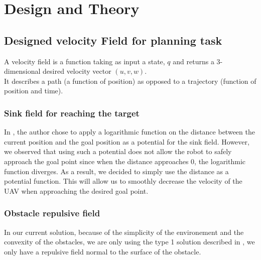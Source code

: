 \section{Design and Theory}
\subsection{Designed velocity Field for planning task}
A velocity field is a function taking as input a state, $q$ and returns a 3-dimensional desired velocity vector $(u,v,w)$.\\ It describes a path (a function of position) as opposed to a trajectory (function of position and time).
\subsubsection{Sink field for reaching the target}
In \cite{mcinnes2003velocity}, the author chose to apply a logarithmic function on the distance between the current position and the goal position as a potential for the sink field. 
However, we observed that using such a potential does not allow the robot to safely approach the goal point since when the distance approaches 0, the logarithmic function diverges.
As a result, we decided to simply use the distance as a potential function. This will allow us to smoothly decrease the velocity of the UAV when approaching the desired goal point.
\subsubsection{Obstacle repulsive field}
In our current solution, because of the simplicity of the environement and the convexity of the obstacles, we are only using the type 1 solution described in \cite{mcinnes2003velocity}, we only have a repulsive field normal to the surface of the obstacle.
